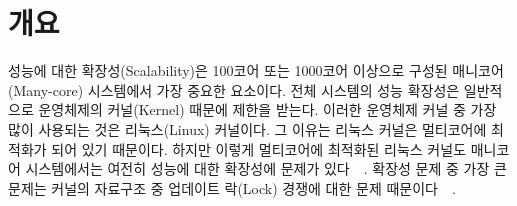 \section{개요} \label{sec:intro}

성능에 대한 확장성(Scalability)은 100코어 또는 1000코어 이상으로 구성된 
매니코어(Many-core) 시스템에서 가장 중요한 요소이다. 
전체 시스템의 성능 확장성은 일반적으로 운영체제의 커널(Kernel) 때문에 제한을 받는다.
이러한 운영체제 커널 중 가장 많이 사용되는 것은 리눅스(Linux) 커널이다. 
그 이유는 리눅스 커널은 멀티코어에 최적화가 되어 있기 때문이다.
하지만 이렇게 멀티코어에 최적화된 리눅스 커널도 매니코어 시스템에서는 여전히 
성능에 대한 확장성에 문제가
있다~\cite{SilasBoydWickizer2010LinuxScales48}~\cite{Changwoo2016UMSF}.
확장성 문제 중 가장 큰 문제는 커널의 자료구조 중 업데이트 락(Lock) 경쟁에 대한
문제 때문이다~\cite{mckenney2011parallel}~\cite{Matveev2015RLU}.



